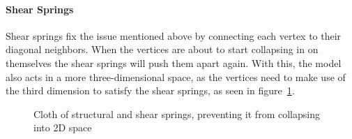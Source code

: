 \paragraph{Shear Springs}
Shear springs fix the issue mentioned above by connecting each vertex to their diagonal neighbors.
When the vertices are about to start collapsing in on themselves the shear springs will push them apart again\cite{jeff_lander_real_time_cloth}.
With this, the model also acts in a more three-dimensional space, as the vertices need to make use of the third dimension to satisfy the shear springs, as seen in figure~\ref{fig:shear_springs_collapsing}.
\begin{figure}[H]
    \centering
    \caption{Cloth of structural and shear springs, preventing it from collapsing into 2D space}
    \label{fig:shear_springs_collapsing}
\end{figure}

